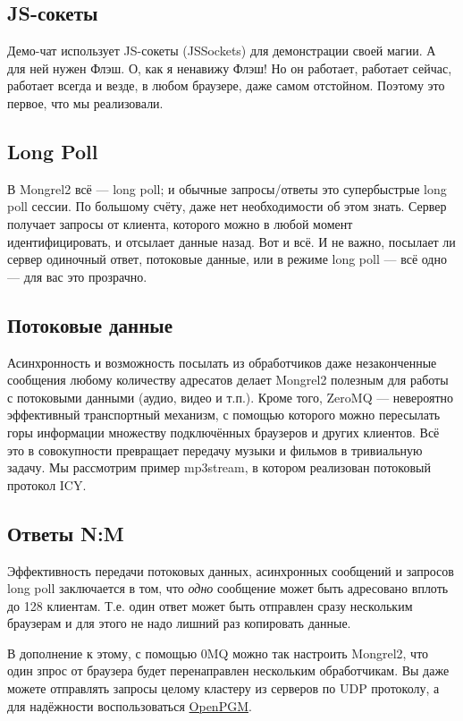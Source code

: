\subsection{JS-сокеты}

Демо-чат использует JS-сокеты (JSSockets) для демонстрации своей магии. А для
ней нужен Флэш. О, как я ненавижу Флэш! Но он работает, работает сейчас,
работает всегда и везде, в любом браузере, даже самом отстойном. Поэтому это
первое, что мы реализовали.

\subsection{Long Poll}

В Mongrel2 всё --- long poll; и обычные запросы/ответы это супербыстрые long
poll сессии. По большому счёту, даже нет необходимости об этом знать. Сервер
получает запросы от клиента, которого можно в любой момент идентифицировать, и
отсылает данные назад. Вот и всё. И не важно, посылает ли сервер одиночный
ответ, потоковые данные, или в режиме long poll --- всё одно --- для вас это
прозрачно.

\subsection{Потоковые данные}

Асинхронность и возможность посылать из обработчиков даже незаконченные
сообщения любому количеству адресатов делает Mongrel2 полезным для работы с
потоковыми данными (аудио, видео и т.п.). Кроме того, ZeroMQ --- невероятно
эффективный транспортный механизм, с помощью которого можно пересылать горы
информации множеству подключённых браузеров и других клиентов. Всё это в
совокупности превращает передачу музыки и фильмов в тривиальную задачу. Мы
рассмотрим пример mp3stream, в котором реализован потоковый протокол ICY. 

\subsection{Ответы N:M}

Эффективность передачи потоковых данных, асинхронных сообщений и запросов long
poll заключается в том, что \emph{одно} сообщение может быть адресовано вплоть
до 128 клиентам. Т.е. один ответ может быть отправлен сразу нескольким браузерам
и для этого не надо лишний раз копировать данные.

В дополнение к этому, с помощью 0MQ можно так настроить Mongrel2, что один зпрос
от браузера будет перенаправлен нескольким обработчикам. Вы даже можете
отправлять запросы целому кластеру из серверов по UDP протоколу, а для
надёжности воспользоваться \href{http://code.google.com/p/openpgm}{OpenPGM}.

